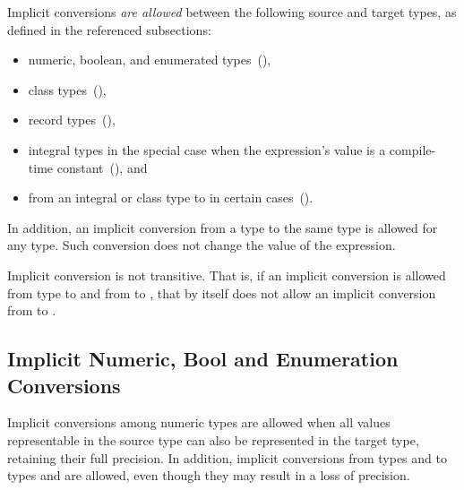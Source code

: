 Implicit conversions \emph{are allowed} between
the following source and target types,
as defined in the referenced subsections:

\begin{itemize}
\item numeric, boolean, and enumerated types~(),
\item class types~(),
\item record types~(),
\item integral types in the special case when the expression's value
      is a compile-time constant~(), and
\item from an integral or class type to 
      in certain cases~().
\end{itemize}

In addition,
an implicit conversion from a type to the same type is allowed for any type.
Such conversion does not change the value of the expression.


Implicit conversion is not transitive. That is, if an implicit conversion
is allowed from type  to  and from  to ,
that by itself does not allow an implicit conversion
from  to .

\subsection{Implicit Numeric, Bool and Enumeration Conversions}
\label{Implicit_NumBoolEnum_Conversions}

Implicit conversions among numeric types are allowed when
all values representable in the source type can also be represented
in the target type, retaining their full precision.
%
%
In addition, implicit conversions from
types  and  to types 
and  are allowed, even though they may result in a loss of
precision.

